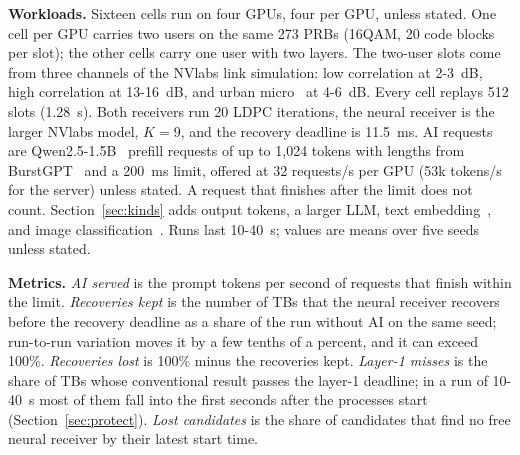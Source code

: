 \documentclass[acmsmall,screen,review,anonymous]{acmart}
\begin{document}
\noindent\textbf{Workloads.} Sixteen cells run on four GPUs, four per GPU, unless stated. One cell per GPU
carries two users on the same 273 PRBs (16QAM, 20 code blocks per slot); the other cells carry one user
with two layers. The two-user slots come from three channels of the NVlabs link simulation: low
correlation at 2-3~dB, high correlation at 13-16~dB, and urban micro~\cite{tr38901} at 4-6~dB. Every cell
replays 512 slots (1.28~s). Both receivers run 20 LDPC iterations, the neural receiver is the larger NVlabs
model, $K=9$, and the recovery deadline is 11.5~ms. AI requests are Qwen2.5-1.5B~\cite{qwen25} prefill
requests of up to 1,024 tokens with lengths from BurstGPT~\cite{burstgpt} and a 200~ms limit, offered at 32
requests/s per GPU (53k tokens/s for the server) unless stated. A request that finishes after the limit
does not count. Section~\ref{sec:kinds} adds output tokens, a larger LLM, text embedding~\cite{bge}, and
image classification~\cite{vit}. Runs last 10-40~s; values are means over five seeds unless stated.

\noindent\textbf{Metrics.} \emph{AI served} is the prompt tokens per second of requests that finish within
the limit. \emph{Recoveries kept} is the number of TBs that the neural receiver recovers before the recovery
deadline as a share of the run without AI on the same seed; run-to-run variation moves it by a few tenths of
a percent, and it can exceed 100\%. \emph{Recoveries lost} is 100\% minus the recoveries kept.
\emph{Layer-1 misses} is the share of TBs whose conventional result
passes the layer-1 deadline; in a run of 10-40~s most of them fall into the first seconds after the processes
start (Section~\ref{sec:protect}). \emph{Lost candidates} is the share of candidates that find no free neural
receiver by their latest start time.
\end{document}
